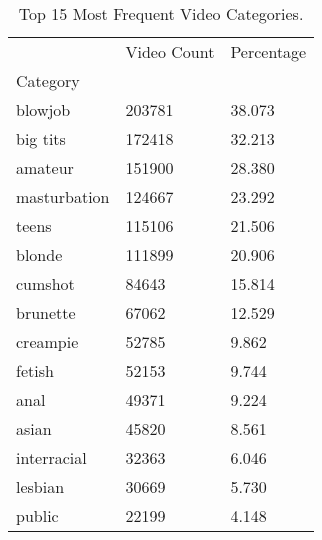 \begin{table}[htbp]
\centering
\caption{Top 15 Most Frequent Video Categories.}
\label{tab:eda_top_categories}
\begin{tabular}{lll}
\toprule
 & Video Count & Percentage \\
Category &  &  \\
\midrule
blowjob & 203781 & 38.073 \\
big tits & 172418 & 32.213 \\
amateur & 151900 & 28.380 \\
masturbation & 124667 & 23.292 \\
teens & 115106 & 21.506 \\
blonde & 111899 & 20.906 \\
cumshot & 84643 & 15.814 \\
brunette & 67062 & 12.529 \\
creampie & 52785 & 9.862 \\
fetish & 52153 & 9.744 \\
anal & 49371 & 9.224 \\
asian & 45820 & 8.561 \\
interracial & 32363 & 6.046 \\
lesbian & 30669 & 5.730 \\
public & 22199 & 4.148 \\
\bottomrule
\end{tabular}

\end{table}